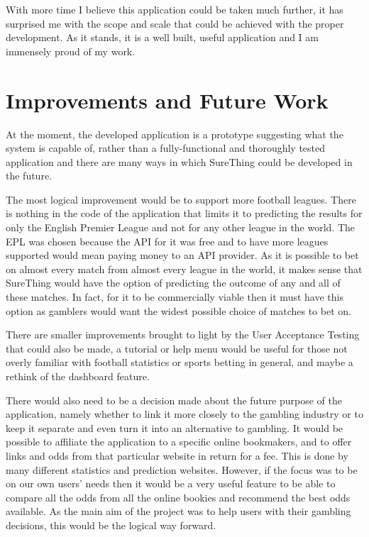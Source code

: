 With more time I believe this application could be taken much further, it has surprised me with the scope and scale that could be achieved with the proper development.  As it stands, it is a well built, useful application and I am immensely proud of my work. 

\section{Improvements and Future Work}
\label{sec:enchancement_conclusion}

At the moment, the developed application is a prototype suggesting what the system is capable of, rather than a fully-functional and thoroughly tested application and there are many ways in which SureThing could be developed in the future.

The most logical improvement would be to support more football leagues. There is nothing in the code of the application that limits it to predicting the results for only the English Premier League and not for any other league in the world. The EPL was chosen because the API for it was free and to have more leagues supported would mean paying money to an API provider. As it is possible to bet on almost every match from almost every league in the world, it makes sense that SureThing would have the option of predicting the outcome of any and all of these matches. In fact, for it to be commercially viable then it must have this option as gamblers would want the widest possible choice of matches to bet on.

There are smaller improvements brought to light by the User Acceptance Testing that could also be made, a tutorial or help menu would be useful for those not overly familiar with football statistics or sports betting in general, and maybe a rethink of the dashboard feature. 

There would also need to be a decision made about the future purpose of the application, namely whether to link it more closely to the gambling industry or to keep it separate and even turn it into an alternative to gambling.  It would be possible to affiliate the application to a specific online bookmakers, and to offer links and odds from that particular website in return for a fee. This is done by many different statistics and prediction websites. However, if the focus was to be on our own users’ needs then it would be a very useful feature to be able to compare all the odds from all the online bookies and recommend the best odds available. As the main aim of the project was to help users with their gambling decisions, this would be the logical way forward.

